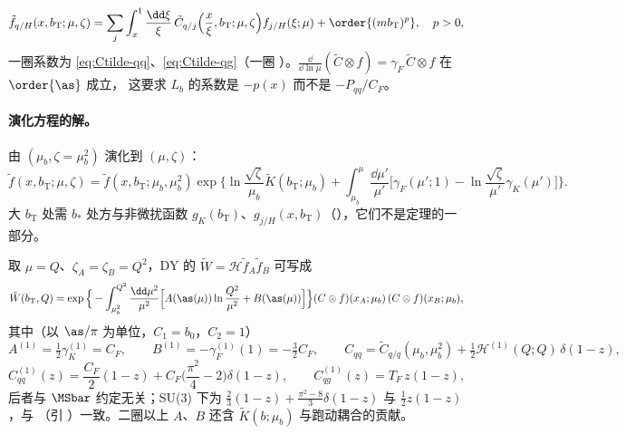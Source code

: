 \begin{proposition}\tagA
\label{prop:small-b-ope}
\begin{equation}
  \tilde f_{q/H}(x,b_{\mathrm T};\mu,\zeta)=\sum_j\int_x^1\frac{\dd\xi}{\xi}\,\tilde C_{q/j}\Big(\frac x\xi,b_{\mathrm T};\mu,\zeta\Big)f_{j/H}(\xi;\mu)+\order{(mb_{\mathrm T})^p},\quad p>0,
  \label{eq:small-b-ope}
\end{equation}
一圈系数为 \eqref{eq:Ctilde-qq}、\eqref{eq:Ctilde-qg}（一圈 \tagR）。$\frac{\dd}{\dd\ln\mu}(\tilde C\otimes f)=\gamma_F\,\tilde C\otimes f$ 在 $\order{\as}$ 成立，
这要求 $L_b$ 的系数是 $-p(x)$ 而不是 $-P_{qq}/C_F$。
\end{proposition}

\paragraph{演化方程的解。}由 $(\mu_b,\zeta=\mu_b^2)$ 演化到 $(\mu,\zeta)$：
\begin{equation}
  \tilde f(x,b_{\mathrm T};\mu,\zeta)=\tilde f(x,b_{\mathrm T};\mu_b,\mu_b^2)\exp\Big\{\ln\frac{\sqrt\zeta}{\mu_b}\tilde K(b_{\mathrm T};\mu_b)
  +\int_{\mu_b}^{\mu}\frac{\dd\mu'}{\mu'}\Big[\gamma_F(\mu';1)-\ln\frac{\sqrt\zeta}{\mu'}\gamma_K(\mu')\Big]\Big\}.
  \label{eq:tmd-evolved}
\end{equation}
大 $b_{\mathrm T}$ 处需 $b_*$ 处方与非微扰函数 $g_K(b_{\mathrm T})$、$g_{j/H}(x,b_{\mathrm T})$（\cite{CollinsSoperSterman1985a,Collins2011,AybatRogers2011}），它们不是定理的一部分。

\begin{proposition}\tagA
\label{prop:css-resummation}
取 $\mu=Q$、$\zeta_A=\zeta_B=Q^2$，DY 的 $\tilde W=\mathcal H\tilde f_A\tilde f_B$ 可写成
\begin{equation}
  \tilde W(b_{\mathrm T},Q)=\exp\Big\{-\int_{\mu_b^2}^{Q^2}\frac{\dd\mu^2}{\mu^2}\Big[A(\as(\mu))\ln\frac{Q^2}{\mu^2}+B(\as(\mu))\Big]\Big\}
  (C\otimes f)(x_A;\mu_b)\,(C\otimes f)(x_B;\mu_b),
  \label{eq:css-W}
\end{equation}
其中（以 $\as/\pi$ 为单位，$C_1=b_0$，$C_2=1$）
\begin{equation}
  A^{(1)}=\tfrac12\gamma_K^{(1)}=C_F,\qquad B^{(1)}=-\gamma_F^{(1)}(1)=-\tfrac32C_F,\qquad
  C_{qq}=\tilde C_{q/q}(\mu_b,\mu_b^2)+\tfrac12\mathcal H^{(1)}(Q;Q)\,\delta(1-z),
  \label{eq:css-AB}
\end{equation}
\begin{equation}
  C^{(1)}_{qq}(z)=\frac{C_F}2(1-z)+C_F\Big(\frac{\pi^2}4-2\Big)\delta(1-z),\qquad C^{(1)}_{qg}(z)=T_F\,z(1-z),
  \label{eq:css-C}
\end{equation}
后者与 $\MSbar$ 约定无关；SU(3) 下为 $\frac23(1-z)+\frac{\pi^2-8}{3}\delta(1-z)$ 与 $\frac12z(1-z)$，与 \cite{BalazsYuan1997}（引
\cite{CollinsSoperSterman1985a,DaviesStirling1984}）一致。二圈以上 $A$、$B$ 还含 $\tilde K(b;\mu_b)$ 与跑动耦合的贡献。
\end{proposition}

